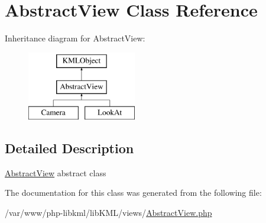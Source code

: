 \hypertarget{classAbstractView}{
\section{AbstractView Class Reference}
\label{dd/d47/classAbstractView}
}
Inheritance diagram for AbstractView:\begin{figure}[H]
\begin{center}
\leavevmode
\includegraphics[height=3.000000cm]{dd/d47/classAbstractView}
\end{center}
\end{figure}


\subsection{Detailed Description}
\hyperlink{classAbstractView}{AbstractView} abstract class 

The documentation for this class was generated from the following file:\begin{DoxyCompactItemize}
\item 
/var/www/php-\/libkml/libKML/views/\hyperlink{AbstractView_8php}{AbstractView.php}\end{DoxyCompactItemize}
